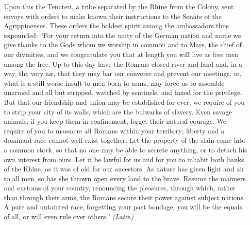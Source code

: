
Upon this the Tencteri, a tribe separated by the Rhine from the Colony, sent envoys with orders to make known their instructions to the Senate of the Agrippinenses. These orders the boldest spirit among the ambassadors thus expounded: ``For your return into the unity of the German nation and name we give thanks to the Gods whom we worship in common and to Mars, the chief of our divinities, and we congratulate you that at length you will live as free men among the free. Up to this day have the Romans closed river and land and, in a way, the very air, that they may bar our converse and prevent our meetings, or, what is a still worse insult to men born to arms, may force us to assemble unarmed and all but stripped, watched by sentinels, and taxed for the privilege. But that our friendship and union may be established for ever, we require of you to strip your city of its walls, which are the bulwarks of slavery. Even savage animals, if you keep them in confinement, forget their natural courage. We require of you to massacre all Romans within your territory; liberty and a dominant race cannot well exist together. Let the property of the slain come into a common stock, so that no one may be able to secrete anything, or to detach his own interest from ours. Let it be lawful for us and for you to inhabit both banks of the Rhine, as it was of old for our ancestors. As nature has given light and air to all men, so has she thrown open every land to the brave. Resume the manners and customs of your country, renouncing the pleasures, through which, rather than through their arms, the Romans secure their power against subject nations. A pure and untainted race, forgetting your past bondage, you will be the equals of all, or will even rule over others.'' \emph{(Latin)}



